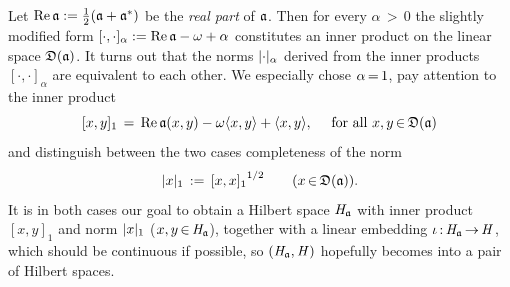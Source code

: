 \documentclass[11pt,twoside]{article}
\begin{document}
\paragraph{} %
Let $\operatorname{Re} \mathfrak{a} := \frac{1}{2}(\mathfrak{a} + \mathfrak{a}^*)$
be the \textit{real part} of $\mathfrak{a}$.
Then for every $\alpha {\,>\,} 0$ the slightly modified form
$[\cdot,\cdot]_{\alpha} := \operatorname{Re} \mathfrak{a} - \omega + \alpha$
constitutes an inner product on the linear space $\mathfrak{D}(\mathfrak{a})$.
It turns out
that the norms $\abs{\cdot} _{\alpha}$
derived from the inner products $[\cdot,\cdot]_{\alpha}$
are equivalent to each other.
We especially chose $\alpha {\,=\,} 1$,
pay attention to the inner product
\[
[x,y]_1 \,=\, \operatorname{Re} \mathfrak{a}(x,y) - \omega \langle x,y \rangle + \langle x,y \rangle,
\quad \mbox{ for all } x,y {\,\in\,} \mathfrak{D}(\mathfrak{a})
\]
and distinguish between the two cases {\wrt} completeness of the norm
\[
\abs{x} _1 \eqdef {[x,x]_1}^{1/2}
\quad \quad (x \xeof \domain{\sql}).
\]
It is in both cases our goal to obtain a Hilbert space $\mathit{H}_{\mathfrak{a}}$
with inner product $[x,y]_1$ and norm $\abs{x} _1$
($x,y {\,\in\,} \mathit{H}_{\mathfrak{a}}$),
together with a linear embedding $\iota {\,:\,} \mathit{H}_{\mathfrak{a}} {\,\to\,} \mathit{H}$,
which should be continuous if possible,
so $(\mathit{H}_{\mathfrak{a}},\mathit{H})$ hopefully becomes into a pair of Hilbert spaces.
\end{document}
